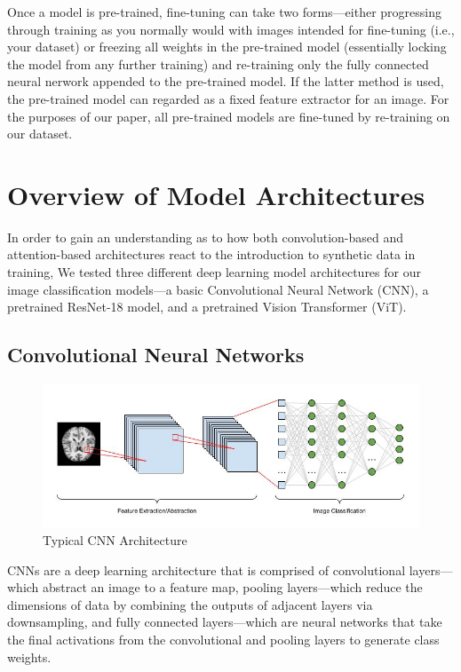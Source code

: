 \documentclass [MS] {uclathes}
\begin{document}
Once a model is pre-trained, fine-tuning can take two forms---either progressing through training as you normally would
with images intended for fine-tuning (i.e., your dataset) or freezing all weights in the pre-trained model (essentially 
locking the model from any further training) and re-training only the fully connected neural nerwork appended to the 
pre-trained model. If the latter method is used, the pre-trained model can regarded as a fixed feature extractor for an 
image. For the purposes of our paper, all pre-trained models are fine-tuned by re-training on our dataset.

\chapter{Overview of Model Architectures}
In order to gain an understanding as to how both convolution-based and attention-based architectures react to the 
introduction to synthetic data in training, We tested three different deep learning model architectures for our image 
classification models---a basic Convolutional Neural Network (CNN), a pretrained ResNet-18 model, and a pretrained 
Vision Transformer (ViT).

\section{Convolutional Neural Networks}

\begin{figure}[h]
    \centering
    \includegraphics[width=0.9\linewidth]{figures/CNN-diagram.jpg}
    \caption{Typical CNN Architecture}
    \label{fig:synthetic-mix}
\end{figure}

CNNs are a deep learning architecture that is comprised of convolutional layers---which abstract an image to a feature 
map, pooling layers---which reduce the dimensions of data by combining the outputs of adjacent layers via downsampling, 
and fully connected layers---which are neural networks that take the final activations from the convolutional and 
pooling layers to generate class weights.
\end{document}
